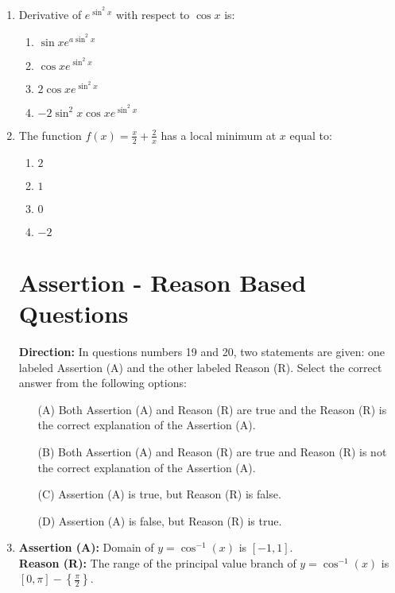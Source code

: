 \documentclass{article}
\begin{document}
\begin{enumerate}
\begin{enumerate}[label=(\alph*)]
\end{enumerate}
 \item Derivative of $e^{\sin^2{x}}$ with respect to $\cos{x}$ is:
\begin{enumerate}[label=(\alph*)]
    \item $\sin{x} e^{a\sin^2{x}}$
    \item ${\cos{x}e^{\sin^2{x}}}$
    \item $2{\cos{x}e^{\sin^2{x}}}$
    \item $-2\sin^2{x}\cos{x}e^{\sin^2{x}}$
\end{enumerate}
\item The function $f(x) = \frac{x}{2} + \frac{2}{x}$ has a local minimum at $x$ equal to:
\begin{enumerate}[label=(\alph*)]
    \item $2$
    \item $1$
    \item $0$
    \item $-2$
\end{enumerate}


\section*{Assertion - Reason Based Questions}
\noindent \textbf{Direction:} In questions numbers 19 and 20, two statements are given: one labeled Assertion (A) and the other labeled Reason (R). Select the correct answer from the following options:
\begin{itemize}
    \item[(A)] Both Assertion (A) and Reason (R) are true and the Reason (R) is the correct explanation of the Assertion (A).
    \item[(B)] Both Assertion (A) and Reason (R) are true and Reason (R) is not the correct explanation of the Assertion (A).
    \item[(C)] Assertion (A) is true, but Reason (R) is false.
    \item[(D)] Assertion (A) is false, but Reason (R) is true.
\end{itemize}

    \item \textbf{Assertion (A):} Domain of $y = \cos^{-1}(x)$ is $[-1, 1]$.\\
    \textbf{Reason (R):} The range of the principal value branch of $y = \cos^{-1}(x)$ is $\left[0, \pi \right] - \left\{\frac{\pi}{2}\right\}$.

    
\end{enumerate}
\end{document}
